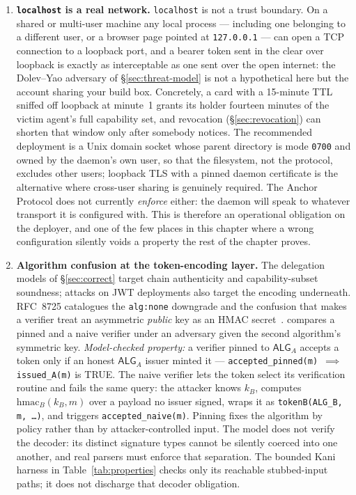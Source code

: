\documentclass[11pt,a4paper]{article}
\theoremstyle{definition}
\begin{document}
\begin{enumerate}
  \item \textbf{\texttt{localhost} is a real network.} \texttt{localhost} is not a trust boundary. On a shared or multi-user machine any local process --- including one belonging to a different user, or a browser page pointed at \texttt{127.0.0.1} --- can open a TCP connection to a loopback port, and a bearer token sent in the clear over loopback is exactly as interceptable as one sent over the open internet: the Dolev--Yao adversary of \S\ref{sec:threat-model} is not a hypothetical here but the account sharing your build box. Concretely, a card with a 15-minute TTL sniffed off loopback at minute~1 grants its holder fourteen minutes of the victim agent's full capability set, and revocation (\S\ref{sec:revocation}) can shorten that window only after somebody notices. The recommended deployment is a Unix domain socket whose parent directory is mode \texttt{0700} and owned by the daemon's own user, so that the filesystem, not the protocol, excludes other users; loopback TLS with a pinned daemon certificate is the alternative where cross-user sharing is genuinely required. The Anchor Protocol does not currently \emph{enforce} either: the daemon will speak to whatever transport it is configured with. This is therefore an operational obligation on the deployer, and one of the few places in this chapter where a wrong configuration silently voids a property the rest of the chapter proves.
  \item \textbf{Algorithm confusion at the token-encoding layer.} The delegation models of \S\ref{sec:correct} target chain authenticity and capability-subset soundness; attacks on JWT deployments also target the encoding underneath. RFC~8725 catalogues the \texttt{alg:none} downgrade and the confusion that makes a verifier treat an asymmetric \emph{public} key as an HMAC secret~.
   compares a pinned and a naive
  verifier under an adversary given the second algorithm's symmetric key.
  \emph{Model-checked property:} a verifier pinned to $\mathsf{ALG}_A$ accepts a
  token only if an honest $\mathsf{ALG}_A$ issuer minted it ---
  \texttt{accepted\_pinned(m) $\implies$ issued\_A(m)} is TRUE.
  The naive verifier lets the token select its verification routine and fails
  the same query: the attacker knows $k_B$, computes $\mathrm{hmac}_B(k_B,m)$
  over a payload no issuer signed, wraps it as
  \texttt{tokenB(ALG\_B,\,m,\,\ldots)}, and triggers
  \texttt{accepted\_naive(m)}. Pinning fixes the algorithm by policy rather than
  by attacker-controlled input. The model does not verify the decoder: its
  distinct signature types cannot be silently coerced into one another, and
  real parsers must enforce that separation. The bounded Kani harness in
  Table~\ref{tab:properties} checks only its reachable stubbed-input paths;
  it does not discharge that decoder obligation.
\end{enumerate}
\end{document}
